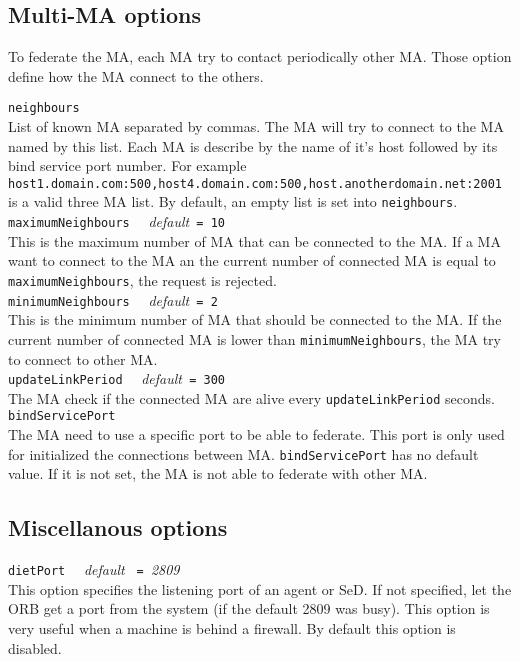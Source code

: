 \subsection{Multi-MA options}

To federate the MA, each MA try to contact periodically other MA. Those option
define how the MA connect to the others.

\noindent
\texttt{neighbours}\\
List of known MA separated by commas. The MA will try to connect to the MA
named by this list. Each MA is describe by the name of it's host followed by
its bind service port number. For example
\texttt{host1.domain.com:500,host4.domain.com:500,host.anotherdomain.net:2001}
is a valid three MA list. By default, an empty list is set into
\texttt{neighbours}.\\

\noindent
\texttt{maximumNeighbours} \ \ \emph{default}\texttt{ = 10}\\
This is the maximum number of MA that can be connected to the MA. If a MA want
to connect to the MA an the current number of connected MA is equal to
\texttt{maximumNeighbours}, the request is rejected.\\

\noindent
\texttt{minimumNeighbours} \ \ \emph{default}\texttt{ = 2}\\
This is the minimum number of MA that should be connected to the MA. If the
current number of connected MA is lower than \texttt{minimumNeighbours}, the MA
try to connect to other MA.\\

\noindent
\texttt{updateLinkPeriod} \ \ \emph{default}\texttt{ = 300}\\
The MA check if the connected MA are alive every \texttt{updateLinkPeriod}
seconds.\\

\noindent
\texttt{bindServicePort}\\
The MA need to use a specific port to be able to federate. This port is only
used for initialized the connections between MA. \texttt{bindServicePort} has
no default value. If it is not set, the MA is not able to federate with other
MA.\\

\subsection{Miscellanous options}

\noindent
\texttt{dietPort} \ \ \emph{default} \texttt{ = }\emph{2809}\\
This option specifies the listening port of an agent or SeD. If not specified, let the ORB get a port from the system (if the default 2809 was busy). This option is very useful when a machine is behind a firewall. By default this option is disabled.

